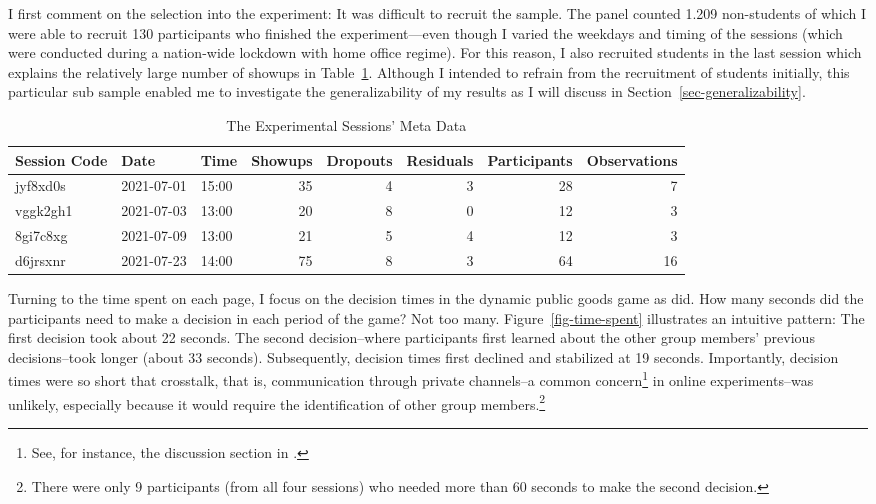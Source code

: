 \documentclass[
  authoryear,
  review,
  3p,
  onecolumn]{elsarticle}
\begin{document}
I first comment on the selection into the experiment: It was difficult
to recruit the sample. The panel counted 1.209 non-students of which I
were able to recruit 130 participants who finished the experiment---even
though I varied the weekdays and timing of the sessions (which were
conducted during a nation-wide lockdown with home office regime). For
this reason, I also recruited students in the last session which
explains the relatively large number of showups in Table~\ref{tbl-meta}.
Although I intended to refrain from the recruitment of students
initially, this particular sub sample enabled me to investigate the
generalizability of my results as I will discuss in
Section~\ref{sec-generalizability}.

\hypertarget{tbl-meta}{}
\begin{table}
\caption{\label{tbl-meta}The Experimental Sessions' Meta Data }\tabularnewline

\centering
\begin{tabular}{l|l|l|r|r|r|r|r}
\hline
Session Code & Date & Time & Showups & Dropouts & Residuals & Participants & Observations\\
\hline
jyf8xd0s & 2021-07-01 & 15:00 & 35 & 4 & 3 & 28 & 7\\
\hline
vggk2gh1 & 2021-07-03 & 13:00 & 20 & 8 & 0 & 12 & 3\\
\hline
8gi7c8xg & 2021-07-09 & 13:00 & 21 & 5 & 4 & 12 & 3\\
\hline
d6jrsxnr & 2021-07-23 & 14:00 & 75 & 8 & 3 & 64 & 16\\
\hline
\end{tabular}
\end{table}

Turning to the time spent on each page, I focus on the decision times in
the dynamic public goods game as \citet{Anderhub2001} did. How many
seconds did the participants need to make a decision in each period of
the game? Not too many. Figure~\ref{fig-time-spent} illustrates an
intuitive pattern: The first decision took about 22 seconds. The second
decision--where participants first learned about the other group
members' previous decisions--took longer (about 33 seconds).
Subsequently, decision times first declined and stabilized at 19
seconds. Importantly, decision times were so short that crosstalk, that
is, communication through private channels--a common concern\footnote{See,
  for instance, the discussion section in \citet[p.~119]{AGM2018}.} in
online experiments--was unlikely, especially because it would require
the identification of other group members.\footnote{There were only 9
  participants (from all four sessions) who needed more than 60 seconds
  to make the second decision.}
\end{document}

